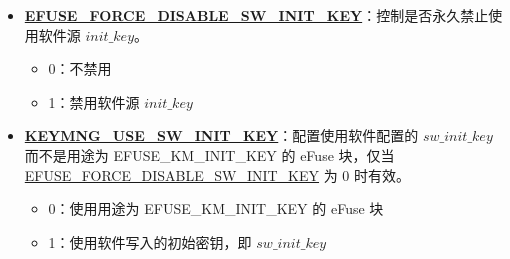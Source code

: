 \documentclass[main\_\_CN.tex]{subfiles}
\begin{document}
\begin{enumerate}
\begin{itemize}
\begin{itemize}
\begin{itemize}
                \item 0：无效
                \item 1：来自 eFuse 块，仅当 \hyperref[fielddesc:EFUSEFORCEUSEKEYMANAGERKEY]{EFUSE\_FORCE\_USE\_KEY\_MANAGER\_KEY} 中的 Bit[4] 为 0 时有效。
            \end{itemize}
        \end{itemize}
        \item \textbf{\hyperref[fielddesc:EFUSEFORCEDISABLESWINITKEY]{EFUSE\_FORCE\_DISABLE\_SW\_INIT\_KEY}}：控制是否永久禁止使用软件源 \hyperref[para:initkey]{\begin{math}init\_key\end{math}}。
        \begin{itemize}
            \item 0：不禁用
            \item 1：禁用软件源 \hyperref[para:initkey]{\begin{math}init\_key\end{math}}
        \end{itemize}
        \item \textbf{\hyperref[fielddesc:KEYMNGUSESWINITKEY]{KEYMNG\_USE\_SW\_INIT\_KEY}}：配置使用软件配置的 \begin{math}sw\_init\_key\end{math} 而不是用途为 EFUSE\_KM\_INIT\_KEY 的 eFuse 块，仅当 \hyperref[fielddesc:EFUSEFORCEDISABLESWINITKEY]{EFUSE\_FORCE\_DISABLE\_SW\_INIT\_KEY} 为 0 时有效。
        \begin{itemize}
            \item 0：使用用途为 EFUSE\_KM\_INIT\_KEY 的 eFuse 块
            \item 1：使用软件写入的初始密钥，即 \begin{math}sw\_init\_key\end{math}
        \end{itemize}


\end{itemize}
\end{enumerate}
\end{document}
